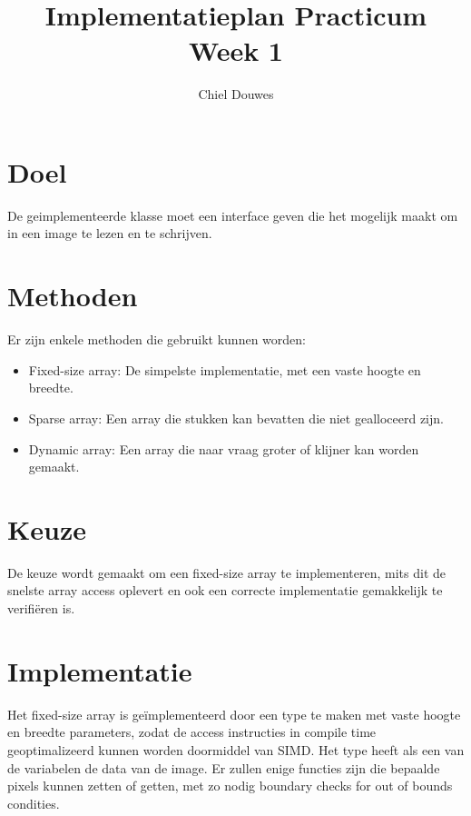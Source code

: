 \documentclass[11pt]{article}
\title{Implementatieplan Practicum Week 1}
\author{Chiel Douwes}
\begin{document}
    \maketitle


    \section{Doel}\label{sec:doel}
    De geimplementeerde klasse moet een interface geven die het mogelijk maakt om in een image te
    lezen en te schrijven.


    \section{Methoden}\label{sec:methoden}
    Er zijn enkele methoden die gebruikt kunnen worden:
    \begin{itemize}
        \item Fixed-size array: De simpelste implementatie, met een vaste hoogte en breedte.
        \item Sparse array: Een array die stukken kan bevatten die niet gealloceerd zijn.
        \item Dynamic array: Een array die naar vraag groter of klijner kan worden gemaakt.
    \end{itemize}


    \section{Keuze}\label{sec:keuze}
    De keuze wordt gemaakt om een fixed-size array te implementeren, mits dit de snelste array
    access oplevert en ook een correcte implementatie gemakkelijk te verifiëren is.


    \section{Implementatie}\label{sec:implementatie}
    Het fixed-size array is geïmplementeerd door een type te maken met vaste hoogte en breedte
    parameters, zodat de access instructies in compile time geoptimalizeerd kunnen worden
    doormiddel van SIMD. Het type heeft als een van de variabelen de data van de image. Er zullen
    enige functies zijn die bepaalde pixels kunnen zetten of getten, met zo nodig boundary checks
    for out of bounds condities.
\end{document}
